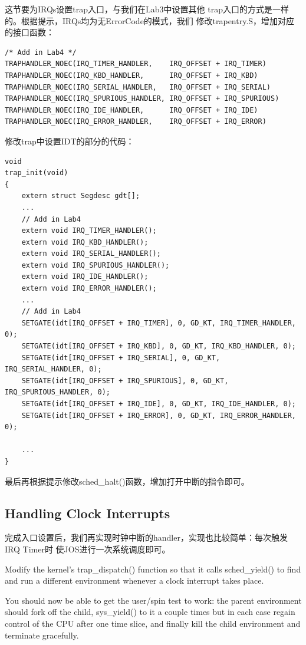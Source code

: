 \documentclass[12pt, letterpaper]{report}
\begin{document}
这节要为IRQs设置trap入口，与我们在Lab3中设置其他
trap入口的方式是一样的。根据提示，IRQs均为无ErrorCode的模式，我们
修改trapentry.S，增加对应的接口函数：\par 

\lstset{style=AssemblyStyle}
\setmainfont{Consolas}
\begin{lstlisting}
/* Add in Lab4 */
TRAPHANDLER_NOEC(IRQ_TIMER_HANDLER,    IRQ_OFFSET + IRQ_TIMER)
TRAPHANDLER_NOEC(IRQ_KBD_HANDLER,      IRQ_OFFSET + IRQ_KBD)
TRAPHANDLER_NOEC(IRQ_SERIAL_HANDLER,   IRQ_OFFSET + IRQ_SERIAL)
TRAPHANDLER_NOEC(IRQ_SPURIOUS_HANDLER, IRQ_OFFSET + IRQ_SPURIOUS)
TRAPHANDLER_NOEC(IRQ_IDE_HANDLER,      IRQ_OFFSET + IRQ_IDE)
TRAPHANDLER_NOEC(IRQ_ERROR_HANDLER,    IRQ_OFFSET + IRQ_ERROR)
\end{lstlisting}
\setmainfont{Times New Roman}
\par
修改trap中设置IDT的部分的代码：\par 
\lstset{style=CStyle}
\setmainfont{Consolas}
\begin{lstlisting}
void
trap_init(void)
{
    extern struct Segdesc gdt[];
    ...
    // Add in Lab4
    extern void IRQ_TIMER_HANDLER();
    extern void IRQ_KBD_HANDLER();
    extern void IRQ_SERIAL_HANDLER();
    extern void IRQ_SPURIOUS_HANDLER();
    extern void IRQ_IDE_HANDLER();
    extern void IRQ_ERROR_HANDLER();
    ...
    // Add in Lab4
    SETGATE(idt[IRQ_OFFSET + IRQ_TIMER], 0, GD_KT, IRQ_TIMER_HANDLER, 0);
    SETGATE(idt[IRQ_OFFSET + IRQ_KBD], 0, GD_KT, IRQ_KBD_HANDLER, 0);
    SETGATE(idt[IRQ_OFFSET + IRQ_SERIAL], 0, GD_KT, IRQ_SERIAL_HANDLER, 0);
    SETGATE(idt[IRQ_OFFSET + IRQ_SPURIOUS], 0, GD_KT, IRQ_SPURIOUS_HANDLER, 0);
    SETGATE(idt[IRQ_OFFSET + IRQ_IDE], 0, GD_KT, IRQ_IDE_HANDLER, 0);
    SETGATE(idt[IRQ_OFFSET + IRQ_ERROR], 0, GD_KT, IRQ_ERROR_HANDLER, 0);
    
    ...
}
\end{lstlisting}
\setmainfont{Times New Roman}

最后再根据提示修改sched\_halt()函数，增加打开中断的指令即可。

\newpage
\subsection{Handling Clock Interrupts}
完成入口设置后，我们再实现时钟中断的handler，实现也比较简单：每次触发IRQ Timer时
使JOS进行一次系统调度即可。\par 
{}
{
    \par 
    {
        Modify the kernel's trap\_dispatch() function 
        so that it calls sched\_yield() to find and 
        run a different environment whenever a clock interrupt takes place.
    }
    \par 
    {
        You should now be able to get the user/spin test to work: 
        the parent environment should fork off the child, 
        sys\_yield() to it a couple times but in each case 
        regain control of the CPU after one time slice, 
        and finally kill the child environment and 
        terminate gracefully.
    }
    \par 
}
\end{document}
